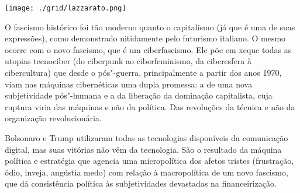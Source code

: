 \pagebreak %


\begin{center}
\hspace*{-3.6cm}
\hspace*{3.1cm}\texttt{[image: ./grid/lazzarato.png]}
\end{center}

\hspace*{-7cm}\hrulefill\hspace*{-7cm}

\medskip

\noindent{}O fascismo histórico foi tão moderno quanto o capitalismo (já que é uma de suas expressões), como demonstrado nitidamente pelo futurismo italiano. O mesmo ocorre com o novo fascismo, que é um ciberfascismo. Ele põe em xeque todas as utopias tecnociber (do ciberpunk ao ciberfeminismo, da ciberesfera à cibercultura) que desde o pós"-guerra, principalmente a partir dos anos 1970, viam nas máquinas cibernéticas uma dupla promessa: a de uma nova subjetividade pós"-humana e a da liberação da dominação capitalista, cuja ruptura viria das máquinas e não da política. Das revoluções da técnica e não da organização revolucionária.

Bolsonaro e Trump utilizaram todas as tecnologias disponíveis da comunicação digital, mas suas vitórias não vêm da tecnologia. São o resultado da máquina política e estratégia que agencia uma micropolítica dos afetos tristes (frustração, ódio, inveja, angústia medo) com relação à macropolítica de um novo fascismo, que dá consistência política às subjetividades devastadas na financeirização.

\vfill

\hspace*{-.4cm}\begin{minipage}[c]{.5\linewidth}
\small{
{}}
\end{minipage}

